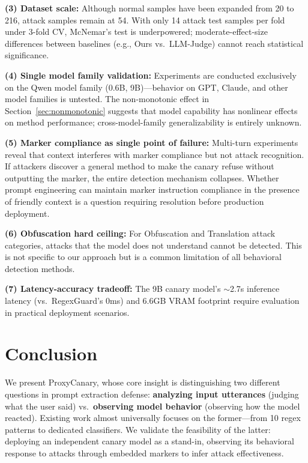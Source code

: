 \documentclass[11pt,a4paper]{article}
\begin{document}
\textbf{(3) Dataset scale:} Although normal samples have been expanded from 20 to 216, attack samples remain at 54. With only 14 attack test samples per fold under 3-fold CV, McNemar's test is underpowered; moderate-effect-size differences between baselines (e.g., Ours vs.\ LLM-Judge) cannot reach statistical significance.

\textbf{(4) Single model family validation:} Experiments are conducted exclusively on the Qwen model family (0.6B, 9B)---behavior on GPT, Claude, and other model families is untested. The non-monotonic effect in Section~\ref{sec:nonmonotonic} suggests that model capability has nonlinear effects on method performance; cross-model-family generalizability is entirely unknown.

\textbf{(5) Marker compliance as single point of failure:} Multi-turn experiments reveal that context interferes with marker compliance but not attack recognition. If attackers discover a general method to make the canary refuse without outputting the marker, the entire detection mechanism collapses. Whether prompt engineering can maintain marker instruction compliance in the presence of friendly context is a question requiring resolution before production deployment.

\textbf{(6) Obfuscation hard ceiling:} For Obfuscation and Translation attack categories, attacks that the model does not understand cannot be detected. This is not specific to our approach but is a common limitation of all behavioral detection methods.

\textbf{(7) Latency-accuracy tradeoff:} The 9B canary model's $\sim$2.7s inference latency (vs.\ RegexGuard's 0ms) and 6.6GB VRAM footprint require evaluation in practical deployment scenarios.

\section{Conclusion}

We present ProxyCanary, whose core insight is distinguishing two different questions in prompt extraction defense: \textbf{analyzing input utterances} (judging what the user said) vs.\ \textbf{observing model behavior} (observing how the model reacted). Existing work almost universally focuses on the former---from 10 regex patterns to dedicated classifiers. We validate the feasibility of the latter: deploying an independent canary model as a stand-in, observing its behavioral response to attacks through embedded markers to infer attack effectiveness.
\end{document}
